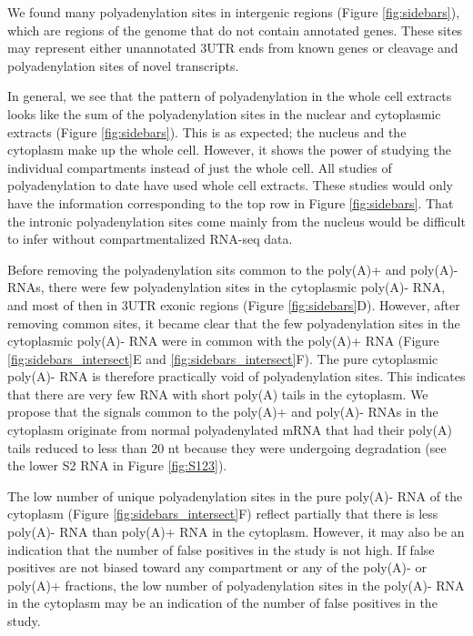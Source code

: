 We found many polyadenylation sites in intergenic regions (Figure
\ref{fig:sidebars}), which are regions of the genome that do not contain
annotated genes. These sites may represent either unannotated 3\ppp UTR
ends from known genes or cleavage and polyadenylation sites of novel
transcripts.

In general, we see that the pattern of polyadenylation in the whole cell
extracts looks like the sum of the polyadenylation sites in the nuclear and
cytoplasmic extracts (Figure \ref{fig:sidebars}). This is as expected; the
nucleus and the cytoplasm make up the whole cell. However, it shows the power
of studying the individual compartments instead of just the whole cell. All
studies of polyadenylation to date have used whole cell extracts. These studies
would only have the information corresponding to the top row in Figure
\ref{fig:sidebars}. That the intronic polyadenylation sites come mainly from
the nucleus would be difficult to infer without compartmentalized RNA-seq data.

Before removing the polyadenylation sits common to the poly(A)+ and poly(A)-
RNAs, there were few polyadenylation sites in the cytoplasmic poly(A)- RNA, and
most of then in 3\ppp UTR exonic regions (Figure \ref{fig:sidebars}D).
However, after removing common sites, it became clear that the few
polyadenylation sites in the cytoplasmic poly(A)- RNA were in common with the
poly(A)+ RNA (Figure \ref{fig:sidebars_intersect}E and
\ref{fig:sidebars_intersect}F). The pure cytoplasmic poly(A)- RNA is therefore
practically void of polyadenylation sites. This indicates that there are very
few RNA with short poly(A) tails in the cytoplasm. We propose that the signals
common to the poly(A)+ and poly(A)- RNAs in the cytoplasm originate from normal
polyadenylated mRNA that had their poly(A) tails reduced to less than 20 nt
because they were undergoing degradation (see the lower S2 RNA in Figure
\ref{fig:S123}).

The low number of unique polyadenylation sites in the pure poly(A)- RNA of the
cytoplasm (Figure \ref{fig:sidebars_intersect}F) reflect partially that there
is less poly(A)- RNA than poly(A)+ RNA in the cytoplasm. However, it may also
be an indication that the number of false positives in the study is not high.
If false positives are not biased toward any compartment or any of the
poly(A)- or poly(A)+ fractions, the low number of polyadenylation sites in the
poly(A)- RNA in the cytoplasm may be an indication of the number of false
positives in the study. 

